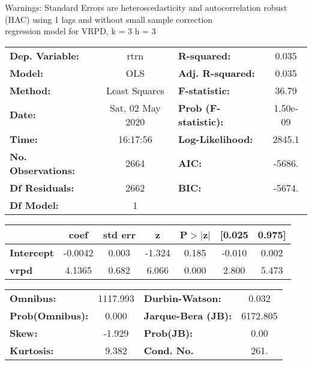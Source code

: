 Warnings: \newline
 [1] Standard Errors are heteroscedasticity and autocorrelation robust (HAC) using 1 lags and without small sample correction\\ 

regression model for VRPD, k = 3 h = 3\begin{center}
\begin{tabular}{lclc}
\toprule
\textbf{Dep. Variable:}    &       rtrn       & \textbf{  R-squared:         } &     0.035   \\
\textbf{Model:}            &       OLS        & \textbf{  Adj. R-squared:    } &     0.035   \\
\textbf{Method:}           &  Least Squares   & \textbf{  F-statistic:       } &     36.79   \\
\textbf{Date:}             & Sat, 02 May 2020 & \textbf{  Prob (F-statistic):} &  1.50e-09   \\
\textbf{Time:}             &     16:17:56     & \textbf{  Log-Likelihood:    } &    2845.1   \\
\textbf{No. Observations:} &        2664      & \textbf{  AIC:               } &    -5686.   \\
\textbf{Df Residuals:}     &        2662      & \textbf{  BIC:               } &    -5674.   \\
\textbf{Df Model:}         &           1      & \textbf{                     } &             \\
\bottomrule
\end{tabular}
\begin{tabular}{lcccccc}
                   & \textbf{coef} & \textbf{std err} & \textbf{z} & \textbf{P$> |$z$|$} & \textbf{[0.025} & \textbf{0.975]}  \\
\midrule
\textbf{Intercept} &      -0.0042  &        0.003     &    -1.324  &         0.185        &       -0.010    &        0.002     \\
\textbf{vrpd}      &       4.1365  &        0.682     &     6.066  &         0.000        &        2.800    &        5.473     \\
\bottomrule
\end{tabular}
\begin{tabular}{lclc}
\textbf{Omnibus:}       & 1117.993 & \textbf{  Durbin-Watson:     } &    0.032  \\
\textbf{Prob(Omnibus):} &   0.000  & \textbf{  Jarque-Bera (JB):  } & 6172.805  \\
\textbf{Skew:}          &  -1.929  & \textbf{  Prob(JB):          } &     0.00  \\
\textbf{Kurtosis:}      &   9.382  & \textbf{  Cond. No.          } &     261.  \\
\bottomrule
\end{tabular}
\end{center}

